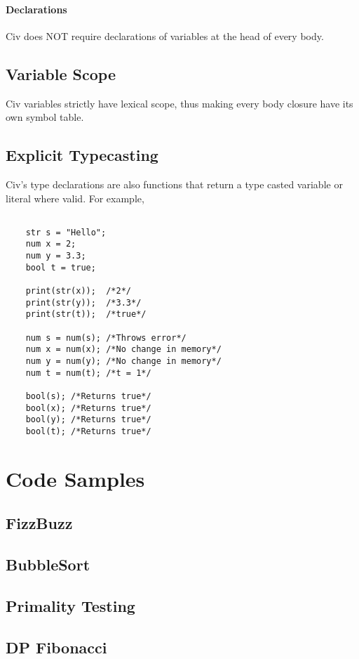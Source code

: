\documentclass[a4paper]{article}
\begin{document}
\paragraph{Declarations}
Civ does NOT require declarations of variables at the head of every body.

\subsection{Variable Scope}
Civ variables strictly have lexical scope, thus making every body closure have its own symbol table.

\subsection{Explicit Typecasting}
Civ's type declarations are also functions that return a type casted variable or literal where valid. For example,

{\selectfont
\begin{lstlisting}

	str s = "Hello";
	num x = 2;
	num y = 3.3;
	bool t = true;

	print(str(x));  /*2*/
	print(str(y));  /*3.3*/
	print(str(t));  /*true*/

	num s = num(s); /*Throws error*/
	num x = num(x); /*No change in memory*/
	num y = num(y); /*No change in memory*/
	num t = num(t); /*t = 1*/
	
	bool(s); /*Returns true*/
	bool(x); /*Returns true*/
	bool(y); /*Returns true*/
	bool(t); /*Returns true*/
\end{lstlisting}
}

\section{Code Samples}
\subsection{FizzBuzz}
\subsection{BubbleSort}
\subsection{Primality Testing}
\subsection{DP Fibonacci}
\end{document}
